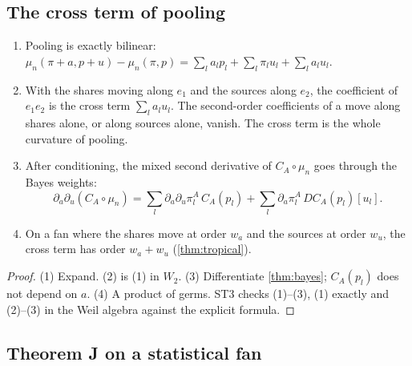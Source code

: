 \documentclass[11pt]{article}
\theoremstyle{definition}\newtheorem{definition}[theorem]{Definition}\newtheorem{remark}[theorem]{Remark}\newtheorem{example}[theorem]{Example}
\begin{document}
\subsection{The cross term of pooling}
\begin{proposition}\label{prop:cross}
\begin{enumerate}
\item[(1)] Pooling is exactly bilinear:
  $\mu_n(\pi+a,p+u)-\mu_n(\pi,p)=\sum_la_lp_l+\sum_l\pi_lu_l+\sum_la_lu_l$.
\item[(2)] With the shares moving along $e_1$ and the sources along $e_2$, the coefficient of $e_1e_2$ is the cross term $\sum_la_lu_l$. The
  second-order coefficients of a move along shares alone, or along sources alone, vanish. The cross term is the whole curvature of pooling.
\item[(3)] After conditioning, the mixed second derivative of $C_A\circ\mu_n$ goes through the Bayes weights:
  \[
  \partial_a\partial_u(C_A\circ\mu_n)=\sum_l\partial_a\partial_u\pi^A_l\,C_A(p_l)+\sum_l\partial_a\pi^A_l\,DC_A(p_l)[u_l].
  \]
\item[(4)] On a fan where the shares move at order $w_a$ and the sources at order $w_u$, the cross term has order $w_a+w_u$ (\cref{thm:tropical}).
\end{enumerate}
\end{proposition}

\begin{proof}
(1) Expand. (2) is (1) in $W_2$. (3) Differentiate \cref{thm:bayes}; $C_A(p_l)$ does not depend on $a$. (4) A product of germs. ST3 checks
(1)--(3), (1) exactly and (2)--(3) in the Weil algebra against the explicit formula.
\end{proof}

\subsection{Theorem J on a statistical fan}
\end{document}
